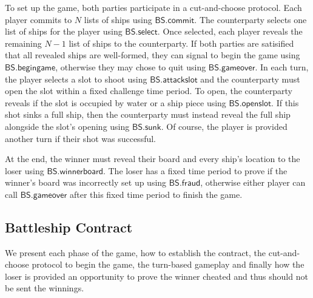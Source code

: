 \documentclass{llncs}
\newcommand{\battleshipfraud}{\mathsf{BS.fraud}}
\newcommand{\battleshipattackslot}{\mathsf{BS.attackslot}}
\newcommand{\battleshipbegin}{\mathsf{BS.begingame}}
\newcommand{\battleshipcommit}{\mathsf{BS.commit}}
\newcommand{\battleshipselectboard}{\mathsf{BS.select}}
\newcommand{\battleshiprevealslot}{\mathsf{BS.openslot}}
\newcommand{\battleshipsinking}{\mathsf{BS.sunk}}
\newcommand{\battleshiprevealboard}{\mathsf{BS.winnerboard}}
\newcommand{\battleshipgameover}{\mathsf{BS.gameover}}
\begin{document}
To set up the game, both parties participate in a cut-and-choose protocol.
Each player commits to $N$ lists of ships using $\battleshipcommit$. 
The counterparty selects one list of ships for the player using $\battleshipselectboard$.
Once selected, each player reveals the remaining $N-1$ list of ships to the counterparty. 
If both parties are satisified that all revealed ships are well-formed, they can signal to begin the game using $\battleshipbegin$, otherwise they may chose to quit using $\battleshipgameover$. 
In each turn, the player selects a slot to shoot using $\battleshipattackslot$ and the counterparty must open the slot  within a fixed challenge time period. 
To open, the counterparty reveals if the slot is occupied by water or a ship piece using $\battleshiprevealslot$.
If this shot sinks a full ship, then the counterparty must instead reveal the full ship alongside the slot's opening using $\battleshipsinking$. 
Of course, the player is provided another turn if their shot was successful.

At the end, the winner must reveal their board and every ship's location to the loser using $\battleshiprevealboard$.
The loser has a fixed time period to prove if the winner's board was incorrectly set up using $\battleshipfraud$, otherwise either player can call $\battleshipgameover$ after this fixed time period to finish the game. 

\subsection{Battleship Contract} 

We present each phase of the game, how to establish the contract, the cut-and-choose protocol to begin the game, the turn-based gameplay and finally how the loser is provided an opportunity to prove the winner cheated and thus should not be sent the winnings. 
\end{document}
